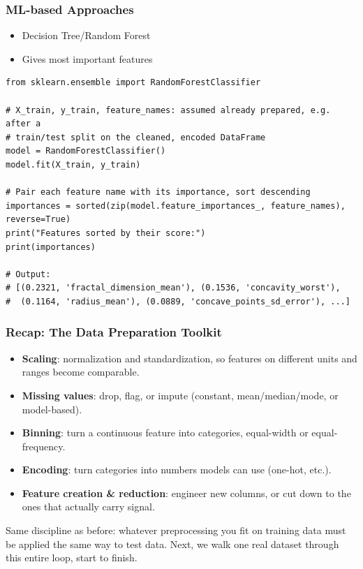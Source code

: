 %
\begin{frame}[fragile]\frametitle{ML-based Approaches}
	\begin{itemize}
	\item Decision Tree/Random Forest
	\item Gives most important features
	\end{itemize}
\begin{lstlisting}
from sklearn.ensemble import RandomForestClassifier

# X_train, y_train, feature_names: assumed already prepared, e.g. after a
# train/test split on the cleaned, encoded DataFrame
model = RandomForestClassifier()
model.fit(X_train, y_train)

# Pair each feature name with its importance, sort descending
importances = sorted(zip(model.feature_importances_, feature_names), reverse=True)
print("Features sorted by their score:")
print(importances)

# Output:
# [(0.2321, 'fractal_dimension_mean'), (0.1536, 'concavity_worst'),
#  (0.1164, 'radius_mean'), (0.0889, 'concave_points_sd_error'), ...]
\end{lstlisting}

\end{frame}

\begin{frame}[fragile]\frametitle{Recap: The Data Preparation Toolkit}
\begin{itemize}
\item \textbf{Scaling}: normalization and standardization, so features on different units
  and ranges become comparable.
\item \textbf{Missing values}: drop, flag, or impute (constant, mean/median/mode, or
  model-based).
\item \textbf{Binning}: turn a continuous feature into categories, equal-width or
  equal-frequency.
\item \textbf{Encoding}: turn categories into numbers models can use (one-hot, etc.).
\item \textbf{Feature creation \& reduction}: engineer new columns, or cut down to the
  ones that actually carry signal.
\end{itemize}
Same discipline as before: whatever preprocessing you fit on training data must be applied
the same way to test data. Next, we walk one real dataset through this entire loop, start to
finish.
\end{frame}


